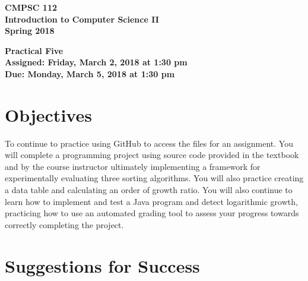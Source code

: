 \documentclass[11pt]{article}
\newcommand{\assignmentduedate}{March 5}
\newcommand{\assignmentassignedate}{March 2}
\newcommand{\assignmentnumber}{Five}
\newcommand{\labyear}{2018}
\newcommand{\labdueday}{Monday}
\newcommand{\labassignday}{Friday}
\newcommand{\labtime}{1:30 pm}
\newcommand{\assigneddate}{Assigned: \labassignday, \assignmentassignedate, \labyear{} at \labtime{}}
\newcommand{\duedate}{Due: \labdueday, \assignmentduedate, \labyear{} at \labtime{}}
\newcommand{\labtitle}[1]
{
  \begin{center}
    \begin{center}
      \bf
      CMPSC 112\\Introduction to Computer Science II\\
      Spring 2018\\
      \medskip
    \end{center}
    \bf
    #1
  \end{center}
}
\begin{document}
\thispagestyle{empty}

\labtitle{Practical \assignmentnumber{} \\ \assigneddate{} \\ \duedate{}}

\section*{Objectives}

To continue to practice using GitHub to access the files for an assignment. You
will complete a programming project using source code provided in the textbook
and by the course instructor ultimately implementing a framework for
experimentally evaluating three sorting algorithms. You will also practice
creating a data table and calculating an order of growth ratio. You will also
continue to learn how to implement and test a Java program and detect
logarithmic growth, practicing how to use an automated grading tool to assess
your progress towards correctly completing the project.

\section*{Suggestions for Success}
\end{document}
